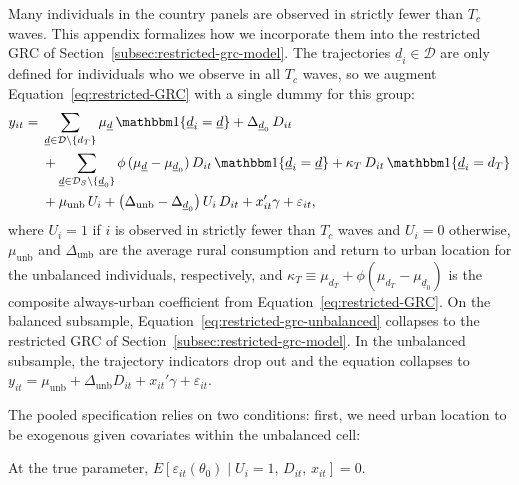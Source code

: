 \documentclass[12pt]{article}
\begin{document}


Many individuals in the country panels are observed in strictly fewer than $T_c$ waves.
This appendix formalizes how we incorporate them into the restricted GRC of Section~\ref{subsec:restricted-grc-model}.
The trajectories $\underline d_i \in \mathcal D$ are only defined for individuals who we observe in all $T_c$ waves, so we augment Equation~\eqref{eq:restricted-GRC} with a single dummy for this group:
\begin{equation}
\label{eq:restricted-grc-unbalanced}
\begin{aligned}
y_{it} =\; &
\sum_{\underline d \in \mathcal D \setminus \{d_T\}}
    \mu_{\underline d}\,\mathbbm 1\{\underline d_i=\underline d\}
+ \Delta_{\underline d_0}\,D_{it} \\
& + \sum_{\underline d \in \mathcal D_S \setminus \{\underline d_0\}}
    \phi\,(\mu_{\underline d}-\mu_{\underline d_0})\,D_{it}\,
    \mathbbm 1\{\underline d_i=\underline d\}
+ \kappa_T\,D_{it}\,
    \mathbbm 1\{\underline d_i=d_T\} \\
& + \mu_{\mathrm{unb}}\,U_i
+ \big(\Delta_{\mathrm{unb}}-\Delta_{\underline d_0}\big)\,U_i\,D_{it}
+ x_{it}'\gamma + \varepsilon_{it},
\end{aligned}
\end{equation}
where $U_i = 1$ if $i$ is observed in strictly fewer than $T_c$ waves and $U_i = 0$ otherwise, $\mu_{\mathrm{unb}}$ and $\Delta_{\mathrm{unb}}$ are the average rural consumption and return to urban location for the unbalanced individuals, respectively, and $\kappa_T \equiv \mu_{d_T} + \phi(\mu_{d_T}-\mu_{\underline d_0})$ is the composite always-urban coefficient from Equation~\eqref{eq:restricted-GRC}.
On the balanced subsample, Equation~\eqref{eq:restricted-grc-unbalanced} collapses to the restricted GRC of Section~\ref{subsec:restricted-grc-model}.
In the unbalanced subsample, the trajectory indicators drop out and the equation collapses to $y_{it} = \mu_{\mathrm{unb}} + \Delta_{\mathrm{unb}} D_{it} + x_{it}'\gamma + \varepsilon_{it}$.

The pooled specification relies on two conditions: first, we need urban location to be exogenous given covariates within the unbalanced cell:

\begin{assumption}
\label{ass:orthogonality}
At the true parameter,
$E[\varepsilon_{it}(\theta_0)\mid U_i=1,\,D_{it},\,x_{it}] = 0$.
\end{assumption}
\end{document}
